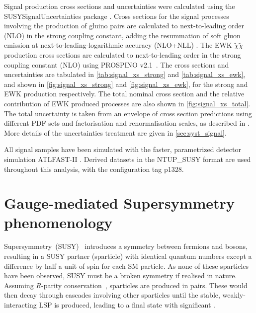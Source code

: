 Signal production cross sections and uncertainties were calculated using the SUSYSignalUncertainties package \cite{SUSYsigunc}. Cross sections
for the signal processes involving the production of gluino pairs are calculated to next-to-leading order (NLO)
in the strong coupling constant, adding the resummation of soft gluon emission at next-to-leading-logarithmic
accuracy (NLO+NLL) \cite{Beenakker:1996ch,Kulesza:2008jb,Kulesza:2009kq,Beenakker:2009ha,Beenakker:2011fu}.
The EWK $\tilde{\chi}\tilde{\chi}$ production cross sections are calculated to next-to-leading order in the strong coupling constant (NLO) using PROSPINO v2.1~\cite{Beenakker:1999xh}.
The cross sections and uncertainties are tabulated in \Tab \ref{tab:signal_xs_strong} and \ref{tab:signal_xs_ewk}, and shown in \Fig \ref{fig:signal_xs_strong} and \ref{fig:signal_xs_ewk}, for the strong and EWK production respectively.
The total nominal cross section and the relative contribution of EWK produced processes are also shown in \Fig \ref{fig:signal_xs_total}.
The total uncertainty is taken from an envelope of cross section predictions using different PDF sets and factorisation and renormalisation scales, as described in \Ref \cite{Kramer:2012bx}. More details of the uncertainties treatment are given in \Sec \ref{sec:syst_signal}. %

All signal samples have been simulated with the faster, parametrized detector simulation ATLFAST-II \cite{Richter-Was:683751}. Derived datasets in the {\sc NTUP\_SUSY}
format are used throughout this analysis, with the configuration tag p1328.









\section{Gauge-mediated Supersymmetry phenomenology}
\label{sec:susy}
Supersymmetry~(SUSY)~\cite{Miyazawa:1966,Ramond:1971gb,Golfand:1971iw,Neveu:1971rx,Neveu:1971iv,Gervais:1971ji,Volkov:1973ix,Wess:1973kz,Wess:1974tw}
introduces a symmetry between fermions and bosons, resulting in a SUSY
partner (sparticle) with identical quantum numbers except a difference
by half a unit of spin for each SM particle. As none
of these sparticles have been observed, SUSY must be a broken symmetry
if realised in nature.  Assuming $R$-parity
conservation~\cite{Fayet:1976et,Fayet:1977yc,Farrar:1978xj,Fayet:1979sa,Dimopoulos:1981zb},
sparticles are
produced in pairs.  These would then decay through cascades involving
other sparticles until the stable, weakly-interacting LSP is produced, leading
to a final state with significant \MET.

